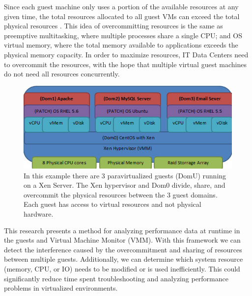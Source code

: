 \indent Since each guest machine only uses a portion of the available resources at any given time, the total resources allocated to all guest VMs can exceed the total physical resources \cite{huber2, amit, buell1}.   This idea of overcommitting resources is the same as preemptive multitasking, where multiple processes share a single CPU; and OS virtual memory, where the total memory available to applications exceeds the physical memory capacity.  In order to maximize resources, IT Data Centers need to overcommit the resources, with the hope that multiple virtual guest machines do not need all resources concurrently.  

\begin{figure}[!h]
  \begin{center}
  \includegraphics[width=6in]{images/VirtualizationExample.jpg}
  \caption{In this example there are 3 paravirtualized guests (DomU) running on a Xen Server.  The Xen hypervisor and Dom0 divide, share, and overcommit the physical resources between the 3 guest domains.  Each guest has access to virtual resources and not physical hardware.}
  \label{virtStack}
  \end{center}
\end{figure}

\indent This research presents a method for analyzing performance data at runtime in the guests and Virtual Machine Monitor (VMM).   With this framework we can detect the interference caused by the overcommitment and sharing of resources between multiple guests.  Additionally, we can determine which system resource (memory, CPU, or IO) needs to be modified or is used inefficiently.  This could significantly reduce time spent troubleshooting and analyzing performance problems in virtualized environments.

